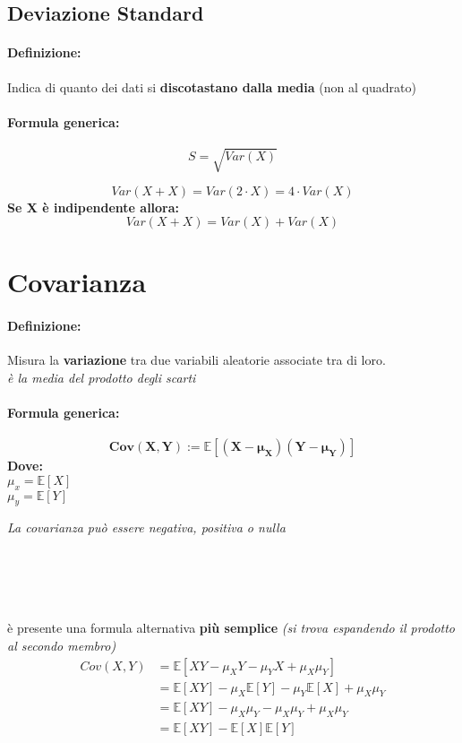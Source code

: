 \documentclass[]{article}
\newcommand{\ev}{\mathbb{E}[X]}
\renewcommand{\ev}[1]{\mathbb{E}[#1]}
\newcommand{\definizione}{\paragraph{Definizione:}}
\newcommand{\formula}{\paragraph{Formula generica:}}
\begin{document}
    \newpage
    \subsection{Deviazione Standard}
    \definizione Indica di quanto dei dati si \textbf{discotastano dalla media} (non al quadrato)

    \formula \[ S = \sqrt{Var(X)} \]

    \[ Var(X + X) = Var(2 \cdot X) = 4 \cdot Var(X) \]
    \linebreak[1]
    \textbf{Se X è indipendente allora:}
    \[ Var(X + X) = Var(X) + Var(X) \]

    \newpage
    \section{Covarianza}
    \definizione Misura la \textbf{variazione} tra due variabili aleatorie associate tra di loro. \\
    \textit{è la media del prodotto degli scarti}
    \formula \[ \boldsymbol{Cov(X,Y) := \ev{(X - \mu_X) (Y - \mu_Y)}} \]
    \textbf{Dove:} \\
    $ \mu_x = \ev{X} $ \\
    $ \mu_y = \ev{Y} $ \\
    \linebreak[4]
    \centerline{\textit{La covarianza può essere negativa, positiva o nulla } }
     \\
     \\
     \\ \\
    è presente una formula alternativa \textbf{più semplice} \textit{(si trova espandendo il prodotto al secondo membro)}
    \begin{equation*}
        \begin{split} 
            Cov(X, Y) &= \ev{XY - \mu_XY - \mu_YX + \mu_X \mu_Y} \\
            & = \ev{XY} - \mu_X \ev{Y} - \mu_Y \ev{X} + \mu_X \mu_Y \\ 
            & = \ev{XY} - \mu_X \mu_Y - \mu_X \mu_Y  + \mu_X \mu_Y  \\
            & = \ev{XY} - \ev{X} \ev{Y}
        \end{split}
    \end{equation*}
\end{document}
